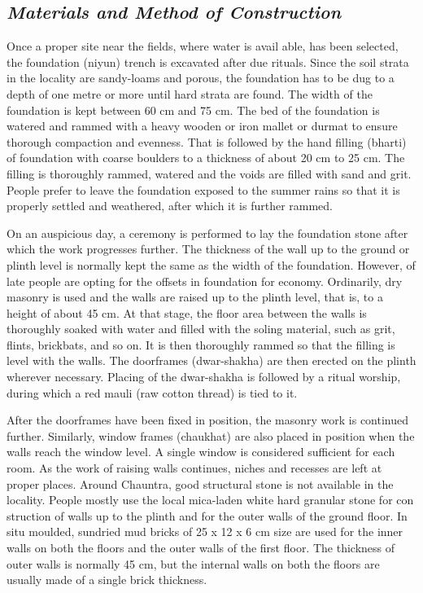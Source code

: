 \subsection*{\textit{Materials and Method of Construction}}

Once a proper site near the fields, where water is avail able, has been selected, the foundation (niyun) trench is excavated after due rituals. Since the soil strata in the locality are sandy-loams and porous, the foundation has to be dug to a depth of one metre or more until hard strata are found. The width of the foundation is kept between 60 cm and 75 cm. The bed of the foundation is watered and rammed with a heavy wooden or iron mallet or durmat to ensure thorough compaction and evenness. That is followed by the hand filling (bharti) of foundation with coarse boulders to a thickness of about 20 cm to 25 cm. The filling is thoroughly rammed, watered and the voids are filled with sand and grit. People prefer to leave the foundation exposed to the summer rains so that it is properly settled and weathered, after which it is further rammed.

On an auspicious day, a ceremony is performed to lay the foundation stone after which the work progresses further. The thickness of the wall up to the ground or plinth level is normally kept the same as the width of the foundation. However, of late people are opting for the offsets in foundation for economy. Ordinarily, dry masonry is used and the walls are raised up to the plinth level, that is, to a height of about 45 cm. At that stage, the floor area between the walls is thoroughly soaked with water and filled with the soling material, such as grit, flints, brickbats, and so on. It is then thoroughly rammed so that the filling is level with the walls. The doorframes (dwar-shakha) are then erected on the plinth wherever necessary. Placing of the dwar-shakha is followed by a ritual worship, during which a red mauli (raw cotton thread) is tied to it.

After the doorframes have been fixed in position, the masonry work is continued further. Similarly, window frames (chaukhat) are also placed in position when the walls reach the window level. A single window is considered sufficient for each room. As the work of raising walls continues, niches and recesses are left at proper places. Around Chauntra, good structural stone is not available in the locality. People mostly use the local mica-laden white hard granular stone for con struction of walls up to the plinth and for the outer walls of the ground floor. In situ moulded, sundried mud bricks of 25 x 12 x 6 cm size are used for the inner walls on both the floors and the outer walls of the first floor. The thickness of outer walls is normally 45 cm, but the internal walls on both the floors are usually made of a single brick thickness.

